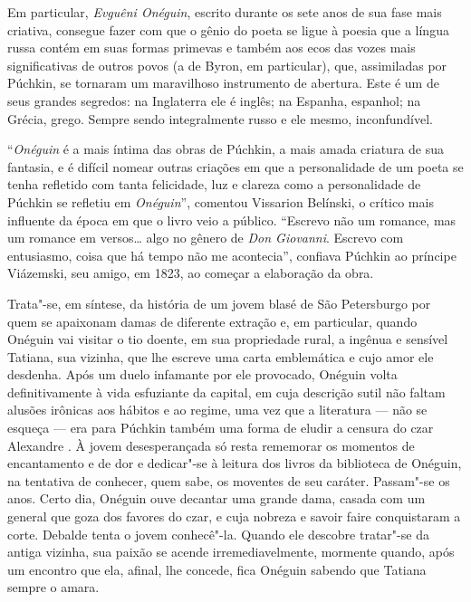 Em particular, \emph{Evguêni Onéguin}, escrito durante os
sete anos de sua fase mais criativa, consegue fazer com que o gênio do poeta se ligue à poesia
que a língua russa contém em suas formas primevas e também aos ecos das
vozes mais significativas de outros povos (a de Byron, em particular),
que, assimiladas por Púchkin, se tornaram um maravilhoso instrumento de
abertura. Este é um de seus grandes segredos: na Inglaterra ele é
inglês; na Espanha, espanhol; na Grécia, grego. Sempre sendo
integralmente russo e ele mesmo, inconfundível.

``\emph{Onéguin} é a mais íntima das obras de Púchkin, a mais amada criatura de
sua fantasia, e é difícil nomear outras criações em que a personalidade
de um poeta se tenha refletido com tanta felicidade, luz e clareza como
a personalidade de Púchkin se refletiu em \emph{Onéguin}'', comentou Vissarion
Belínski, o crítico mais influente da época em que o livro veio a
público. ``Escrevo não um romance, mas um romance em versos\ldots{} algo no
gênero de \emph{Don Giovanni}. Escrevo com entusiasmo, coisa que há tempo não
me acontecia'', confiava Púchkin ao príncipe Viázemski, seu amigo, em
1823, ao começar a elaboração da obra.

Trata"-se, em síntese, da história de um jovem blasé de São Petersburgo
por quem se apaixonam damas de diferente extração e, em particular,
quando Onéguin vai visitar o tio doente, em sua propriedade rural, a
ingênua e sensível Tatiana, sua vizinha, que lhe escreve uma carta
emblemática e cujo amor ele desdenha. Após um duelo infamante por ele
provocado, Onéguin volta definitivamente à vida esfuziante da capital,
em cuja descrição sutil não faltam alusões irônicas aos hábitos e ao
regime, uma vez que a literatura --- não se esqueça --- era para Púchkin
também uma forma de eludir a censura do czar Alexandre . À jovem
desesperançada só resta rememorar os momentos de encantamento e de dor e
dedicar"-se à leitura dos livros da biblioteca de Onéguin, na tentativa
de conhecer, quem sabe, os moventes de seu caráter. Passam"-se os anos.
Certo dia, Onéguin ouve decantar uma grande dama, casada com um general
que goza dos favores do czar, e cuja nobreza e savoir faire conquistaram
a corte. Debalde tenta o jovem conhecê"-la. Quando ele descobre tratar"-se
da antiga vizinha, sua paixão se acende irremediavelmente, mormente
quando, após um encontro que ela, afinal, lhe concede, fica Onéguin
sabendo que Tatiana sempre o amara.


